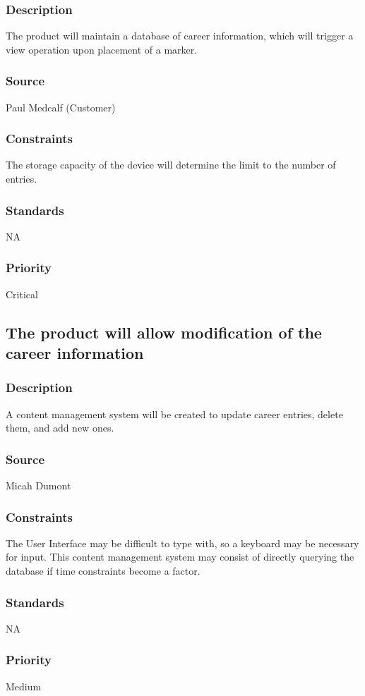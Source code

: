 \subsubsection{Description}
The product will maintain a database of career information, which will trigger a view operation upon placement of a marker.
\subsubsection{Source}
Paul Medcalf (Customer)
\subsubsection{Constraints}
The storage capacity of the device will determine the limit to the number of entries.
\subsubsection{Standards}
NA
\subsubsection{Priority}
Critical

\subsection{The product will allow modification of the career information}
\subsubsection{Description}
A content management system will be created to update career entries, delete them, and add new ones.
\subsubsection{Source}
Micah Dumont
\subsubsection{Constraints}
The User Interface may be difficult to type with, so a keyboard may be necessary for input. This content management system may consist of directly querying the database if time constraints become a factor.
\subsubsection{Standards}
NA
\subsubsection{Priority}
Medium

